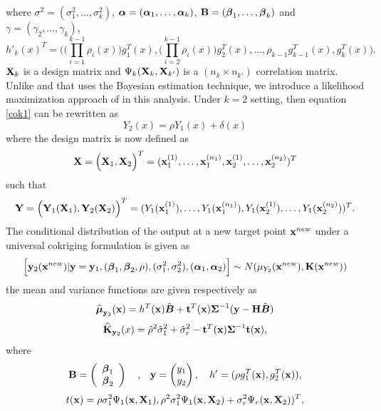 where $\sigma^2=(\sigma_1^2,\ldots,\sigma_k^2)$, ${\boldsymbol{\alpha}}=({\boldsymbol{\alpha}}_1,\ldots,{\boldsymbol{\alpha}}_k)$,  ${\bf B}=({\boldsymbol{\beta}}_1,\ldots,{\boldsymbol{\beta}}_k)$ and $\gamma=(\gamma_2,\ldots,\gamma_k)$,  
$$h'_k(x)^T=\Bigg( \Big( \prod \limits_{i=1}^{k-1} \rho_i(x)\Big) g^T_1(x), \Big( \prod \limits_{i=2}^{k-1} \rho_i(x)\Big) g^T_2(x), \ldots,\rho_{k-1} g^T_{k-1}(x),g^T_k(x) \Bigg).$$
${\bf X}_k$ is a design matrix and
$\Psi_k({\bf X}_k, {\bf X}_{k'})$ is a $(n_k \times n_{k'})$ correlation matrix.
Unlike \citet{co1} and \citet{co2} that uses the Bayesian estimation technique, we introduce a likelihood maximization approach of \citet{co3} in this analysis.
Under $k=2$ setting, then equation \ref{cok1} can be rewritten as 
\begin{equation}
Y_2(x) =\rho Y_{1}(x) + \delta(x)
\end{equation}
where the design matrix is now defined as
\begin{equation}
{\bf X}=\Big({\bf X}_1, {\bf X}_2    \Big)^T=({\bf x}^{(1)}_1,\ldots,{\bf x}^{(n_1)}_1,{\bf x}^{(1)}_2,\ldots,{\bf x}^{(n_2)}_2)^T
\end{equation}
such that
\begin{equation}
{\bf Y}=\Big({\bf Y}_1({\bf X}_1), {\bf Y}_2({\bf X}_2)  \Big)^T=(Y_1({\bf x}_1^{(1)}),\ldots,Y_1({\bf x}_1^{(n_1)}),Y_1({\bf x}_2^{(1)}),\ldots,Y_1({\bf x}_2^{(n_2)}))^T.
\end{equation}
The conditional distribution of the output at a new target point ${\bf x}^{new}$ under a universal cokriging formulation is given as
\begin{equation}
\Big[{\bf y}_2({\bf x}^{new})|{\bf y}={\bf y}_1,({\boldsymbol{\beta}}_1,{\boldsymbol{\beta}}_2,\rho),(\sigma_1^2,\sigma_2^2),({\boldsymbol{\alpha}}_1,{\boldsymbol{\alpha}}_2)\Big] \sim N(\mu_{Y_2}({\bf x}^{new}),{\mathbf{K}}({\bf x}^{new}))
\end{equation}
the mean and variance functions are given respectively as
\begin{equation}\label{}
\widehat{{{\boldsymbol{\mu}}}}_{{\bf y}_2}{({\bf x})}= h^T({\bf x}){\hat{\boldsymbol{B}}}+ {\bf t}^T({\bf x}){\boldsymbol{\Sigma}}^{-1}({\bf y} -{\bf H}{\hat{\boldsymbol{B}}})
\end{equation}
\begin{equation}\label{}
\widehat {{\mathbf{K}}}_{{\bf y}_2}(x)=\hat\rho^2\hat \sigma_1^2+ \hat\sigma_r^2 - {\bf t}^T({\bf x}){\boldsymbol{\Sigma}}^{-1}{\bf t}({\bf x}),
\end{equation}
where 
\[ 
{\bf B}=
\left(\begin{array}{cc}
{\boldsymbol{\beta}}_1\\
{\boldsymbol{\beta}}_2
\end{array} \right)
\quad \mbox{,}
\quad 
{\bf y}=
\begin{pmatrix}
y_1\\
y_2
\end{pmatrix}, 
\quad
h'=(\rho g_1^T({\bf x}),g_2^T({\bf x})),
\]
\begin{equation}
t({\bf x})=\rho \sigma_1^2 \Psi_1({\bf x},{\bf X}_1), \rho^2\sigma_1^2\Psi_1({\bf x},{\bf X}_2)+\sigma_r^2\Psi_r({\bf x},{\bf X}_2))^T,
\end{equation}

